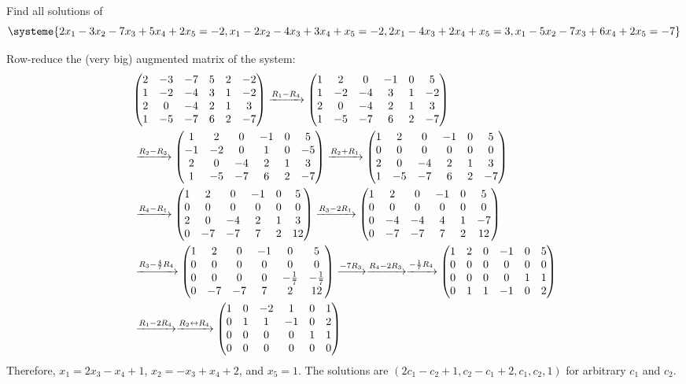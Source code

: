 \begin{xca}
  Find all solutions of
  \[
    \systeme{
      2x_1 - 3x_2 - 7x_3 + 5x_4 + 2x_5 = -2,
      x_1 - 2x_2 - 4x_3 + 3x_4 + x_5 = -2,
      2x_1 - 4x_3 + 2x_4 + x_5 = 3,
      x_1 - 5x_2 - 7x_3 + 6x_4 + 2x_5 = -7
    }
  \]
\end{xca}
\begin{sol}
  Row-reduce the (very big) augmented matrix of the system:
  \begin{equation*}
    \begin{split}
      & \mqty(2&-3&-7&5&2&-2 \\ 1&-2&-4&3&1&-2 \\ 2&0&-4&2&1&3 \\ 1&-5&-7&6&2&-7)
      \xto{R_1 - R_4} \mqty(1&2&0&-1&0&5 \\ 1&-2&-4&3&1&-2 \\ 2&0&-4&2&1&3 \\ 1&-5&-7&6&2&-7) \\
      & \xto{R_2 - R_3} \mqty(1&2&0&-1&0&5 \\ -1&-2&0&1&0&-5 \\ 2&0&-4&2&1&3 \\ 1&-5&-7&6&2&-7)
      \xto{R_2 + R_1} \mqty(1&2&0&-1&0&5 \\ 0&0&0&0&0&0 \\ 2&0&-4&2&1&3 \\ 1&-5&-7&6&2&-7) \\
      & \xto{R_4 - R_1} \mqty(1&2&0&-1&0&5 \\ 0&0&0&0&0&0 \\ 2&0&-4&2&1&3 \\ 0&-7&-7&7&2&12)
      \xto{R_3 - 2R_1} \mqty(1&2&0&-1&0&5 \\ 0&0&0&0&0&0 \\ 0&-4&-4&4&1&-7 \\ 0&-7&-7&7&2&12) \\
      & \xto{R_3 - \frac47 R_4} \mqty(1&2&0&-1&0&5 \\ 0&0&0&0&0&0 \\ 0&0&0&0&-\frac17&-\frac17 \\ 0&-7&-7&7&2&12)
      \xto{-7R_3} \xto{R_4 - 2R_3} \xto{-\frac17 R_4}
      \mqty(1&2&0&-1&0&5 \\ 0&0&0&0&0&0 \\ 0&0&0&0&1&1 \\ 0&1&1&-1&0&2) \\
      & \xto{R_1 - 2R_4} \xto{R_2 \harr R_4}
      \mqty(1&0&-2&1&0&1 \\ 0&1&1&-1&0&2 \\ 0&0&0&0&1&1 \\ 0&0&0&0&0&0)
    \end{split}
  \end{equation*}
  Therefore, $x_1 = 2x_3 - x_4 + 1$, $x_2 = -x_3 + x_4 + 2$, and $x_5 = 1$.
  The solutions are $(2c_1 - c_2 + 1, c_2 - c_1 + 2, c_1, c_2, 1)$ for arbitrary $c_1$ and $c_2$.
\end{sol}


